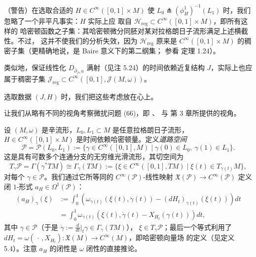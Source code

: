 \begin{Rem}\label{rem:5.26}
（警告）在选取合适的 $H\in C^\infty([0,1]\times M)$ 使
$L_0\pitchfork(\phi_H^1)^{-1}(L_1)$ 时，我们忽略了一个非平凡事实：$H$ 实际上应
取自 $\mathcal H_{\mathrm{reg}}\subset C^\infty([0,1]\times M)$，即所有这样的
哈密顿函数之子集：其哈密顿微分同胚对某对拉格朗日子流形满足上述横截性。不过，
这并不使我们的分析失效，因为 $\mathcal H_{\mathrm{reg}}$ 原来是
$C^\infty([0,1]\times M)$ 的稠密子集（更精确地说，是 Baire 意义下的第二纲集；
参看 \cite{Sal97} 定理 1.24）。

类似地，保证线性化 $D_{\bar\partial_J,u}$ 满射（见注 5.24）的时间依赖近复结构
$J$，实际上也应属于稠密子集
$\mathcal J_{\mathrm{reg}}\subset C^\infty([0,1],\mathcal J(M,\omega))$。

选取数据 $(J,H)$ 时，我们把这些考虑放在心上。
\end{Rem}


让我们从略有不同的视角考察微扰问题 (66)，即 \cite{Oh91}、\cite{McS94} 与
\cite{Mer14} 第 3 章所提供的视角。

\begin{Def}\label{def:5.27}
设 $(M,\omega)$ 是辛流形，$L_0,L_1\subset M$ 是任意拉格朗日子流形，
$H\in C^\infty([0,1]\times M)$ 是时间依赖哈密顿量。定义\emph{道路空间}
\[
\mathcal P=\mathcal P(L_0,L_1):=\{\gamma\in C^\infty([0,1],M)\mid
\gamma(0)\in L_0,\ \gamma(1)\in L_1\}.
\]
这是具有可数多个连通分支的无穷维光滑流形，其切空间为
\[
T_\gamma\mathcal P=\Gamma(\gamma^*TM)\cong\Gamma_\gamma(TM)
:=\{\xi\in C^\infty([0,1],TM)\mid\xi(t)\in T_{\gamma(t)}M\},
\]
对每个 $\gamma\in\mathcal P$。我们通过它所等同的 $C^\infty(\mathcal P)$-线性映射
$\mathfrak X(\mathcal P)\to C^\infty(\mathcal P)$ 定义闭 $1$-形式
$a_H\in\Omega^1(\mathcal P)$：
\begin{equation}
\begin{aligned}
(a_H)_\gamma(\xi)
&:=\int_0^1\left(\omega_{\gamma(t)}(\xi(t),\dot\gamma(t))
-(dH_t)_{\gamma(t)}(\xi(t))\right)dt\\
&=\int_0^1\omega_{\gamma(t)}
\left(\xi(t),\dot\gamma(t)-X_{H_t}(\gamma(t))\right)dt,
\end{aligned}
\label{eq:5.68}
\end{equation}
其中 $\gamma\in\mathcal P$（于是
$\dot\gamma:=\frac{d}{dt}\big|_t\gamma\in\Gamma_\gamma(TM)$），
$\xi\in T_\gamma\mathcal P$；最后一个等式利用了
$dH_t=\omega(\,\cdot\,,X_{H_t}):\mathfrak X(M)\to C^\infty(M)$，即哈密顿向量场
的定义（见定义 5.4）。注意 $a_H$ 的闭性是 $\omega$ 闭性的直接推论。
\end{Def}

